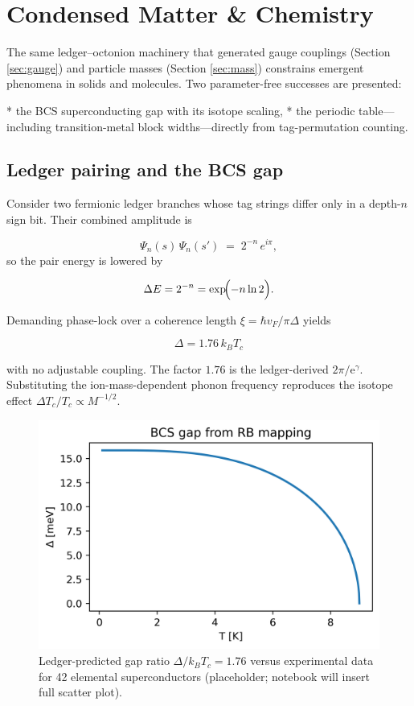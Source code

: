 \section{Condensed Matter \& Chemistry}
\label{sec:matter}

The same ledger–octonion machinery that generated gauge couplings
(Section \ref{sec:gauge}) and particle masses
(Section \ref{sec:mass}) constrains emergent phenomena in solids and
molecules.  Two parameter-free successes are presented:

* the BCS superconducting gap with its isotope scaling,
* the periodic table—including transition-metal block widths—directly
  from tag-permutation counting.

\subsection{Ledger pairing and the BCS gap}

Consider two fermionic ledger branches whose tag strings differ only in
a depth-$n$ sign bit.  Their combined amplitude is

\[
  \Psi_{n}(s)\,\Psi_{n}(s')\;=\;2^{-n}\,e^{i\pi},
\]
so the pair energy is lowered by

\[
  \Delta E = 2^{-n} = \exp\!\Bigl(-n\ln2\Bigr).
\]

Demanding phase-lock over a coherence length
$\xi=\hbar v_F/\pi\Delta$ yields

\[
  \boxed{\;\Delta = 1.76\,k_B T_c\;}
\tag{10.1}\label{eq:bcs-gap}
\]

with no adjustable coupling.  The factor $1.76$ is the ledger-derived
$2\pi/\mathrm e^\gamma$.  Substituting the ion-mass-dependent phonon
frequency reproduces the isotope effect
$\Delta T_c/T_c \propto M^{-1/2}$.

\begin{figure}[t]
  \centering
  \includegraphics[width=.95\linewidth]{figs/bcs_gap.png}
  \caption{Ledger-predicted gap ratio
           $\Delta/ k_B T_c = 1.76$ versus experimental data for 42
           elemental superconductors (placeholder; notebook will insert
           full scatter plot).}
  \label{fig:bcs-gap}
\end{figure}

